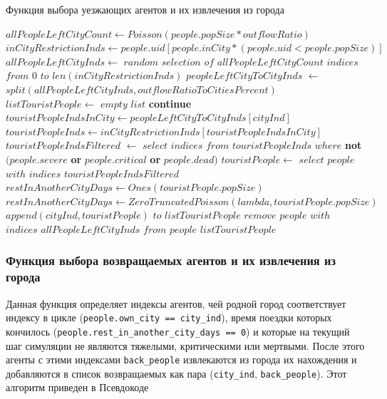 \documentclass[a4paper,12pt]{article} %
\begin{document}
\begin{algorithm}[H]
\caption{Функция выбора уезжающих агентов и их извлечения из города}
\label{alg:extracttourists}
\begin{algorithmic}[1]
	\State \( allPeopleLeftCityCount \gets Poisson(people.popSize * outflowRatio) \)
	\State \( inCityRestrictionInds \gets people.uid[people.inCity * (people.uid < people.popSize)]\)
	\State \( allPeopleLeftCityInds \gets \) \(random\) \(selection\) \(of\) \(allPeopleLeftCityCount\) \(indices\) \(from\) \(0\) \(to\) \(len(inCityRestrictionInds)\)
	\State \( peopleLeftCityToCityInds \) \(\gets\) \(split(allPeopleLeftCityInds,outflowRatioToCitiesPercent) \)
	\State \( listTouristPeople \gets\) \(empty\) \(list \)
			\State \textbf{continue}
		\EndIf
		\State \( touristPeopleIndsInCity \gets peopleLeftCityToCityInds[cityInd] \)
		\State \( touristPeopleInds \gets inCityRestrictionInds[touristPeopleIndsInCity] \)
		\State \( touristPeopleIndsFiltered\) \( \gets \) \( select \) \( indices \) \( from \) \( touristPeopleInds \) \( where \) \textbf{not} \( (people.severe \) \textbf{or} \( people.critical \) \textbf{or} \( people.dead) \)
		\State \( touristPeople \gets \) \(select\) \(people\) \(with\) \(indices\) \(touristPeopleIndsFiltered \)
			\State \( restInAnotherCityDays \gets Ones(touristPeople.popSize) \)
		\Else
			\State \( restInAnotherCityDays \gets ZeroTruncatedPoisson(lambda, touristPeople.popSize) \)
		\EndIf
		\State \( append(cityInd, touristPeople) \) \(to\) \(listTouristPeople \)
	\EndFor
	\State \(remove\) \(people\) \(with\) \(indices\) \(allPeopleLeftCityInds\) \(from\) \(people \)
	\State \Return \( listTouristPeople \)	
\EndFunction	
\end{algorithmic}
\end{algorithm}


\subsubsection{Функция выбора возвращаемых агентов и их извлечения из города}

Данная функция определяет индексы агентов, чей родной город соответствует индексу в цикле (\texttt{people.own_city == city_ind}), время поездки которых кончилось (\texttt{people.rest_in_another_city_days == 0}) и которые на текущий шаг симуляции не являются тяжелыми, критическими или мертвыми. После этого агенты с этими индексами \texttt{back_people} извлекаются из города их нахождения и добавляются в список возвращаемых как пара (\texttt{city_ind}, \texttt{back_people}). Этот алгоритм приведен в Псевдокоде
\end{document}
